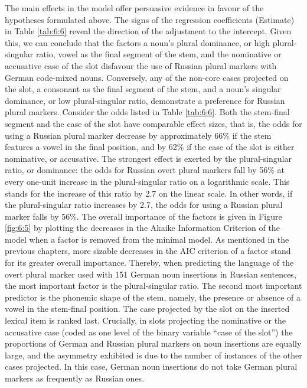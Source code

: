 The main effects in the model offer persuasive evidence in favour of the hypotheses formulated above. The signs of the regression coefficients (Estimate) in Table \ref{tab:6:6} reveal the direction of the adjustment to the intercept. Given this, we can conclude that the factors a noun’s plural dominance, or high plural-singular ratio, vowel as the final segment of the stem, and the nominative or accusative case of the slot disfavour the use of Russian plural markers with German code-mixed nouns. Conversely, any of the non-core cases projected on the slot, a consonant as the final segment of the stem, and a noun's singular dominance, or low plural-singular ratio, demonstrate a preference for Russian plural markers. Consider the odds listed in Table \ref{tab:6:6}. Both the stem-final segment and the case of the slot have comparable effect sizes, that is, the odds for using a Russian plural marker decrease by approximately 66\% if the stem features a vowel in the final position, and by 62\% if the case of the slot is either nominative, or accusative. The strongest effect is exerted by the plural-singular ratio, or dominance: the odds for Russian overt plural markers fall by 56\% at every one-unit increase in the plural-singular ratio on a logarithmic scale. This stands for the increase of this ratio by 2.7 on the linear scale. In other words, if the plural-singular ratio increases by 2.7, the odds for using a Russian plural marker falls by 56\%. The overall importance of the factors is given in Figure \ref{fig:6:5} by plotting the decreases in the Akaike Information Criterion of the model when a factor is removed from the minimal model. As mentioned in the previous chapters, more sizable decreases in the AIC criterion of a factor stand for its greater overall importance. Thereby, when predicting the language of the overt plural marker used with 151 German noun insertions in Russian sentences, the most important factor is the plural-singular ratio. The second most important predictor is the phonemic shape of the stem, namely, the presence or absence of a vowel in the stem-final position. The case projected by the slot on the inserted lexical item is ranked last. Crucially, in slots projecting the nominative or the accusative case (coded as one level of the binary variable “case of the slot”) the proportions of German and Russian plural markers on noun insertions are equally large, and the asymmetry exhibited is due to the number of instances of the other cases projected. In this case, German noun insertions do not take German plural markers as frequently as Russian ones.

